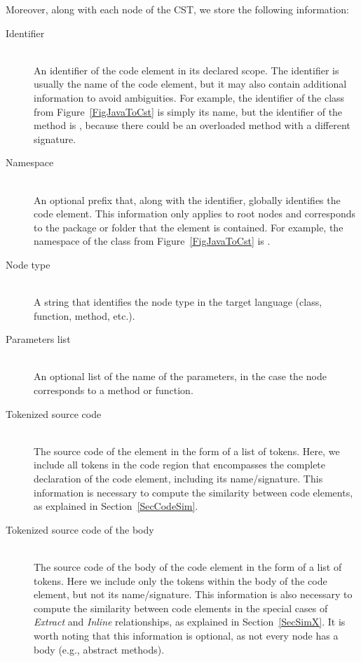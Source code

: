 Moreover, along with each node of the CST, we store the following information:
\begin{description}
    \item[Identifier] \hfill \\
    An identifier of the code element in its declared scope. 
    The identifier is usually the name of the code element, but it may also contain additional information to avoid ambiguities.
    For example, the identifier of the class  from Figure~\ref{FigJavaToCst} is simply its name, but the identifier of the method  is ,  because there could be an overloaded method with a different signature.
    
    \item[Namespace] \hfill \\
    An optional prefix that, along with the identifier, globally identifies the code element. 
    This information only applies to root nodes and corresponds to the package or folder that the element is contained. For example, the namespace of the class  from Figure~\ref{FigJavaToCst} is .
    
    \item[Node type] \hfill \\
    A string that identifies the node type in the target language (class, function, method, etc.).
    
    \item[Parameters list]  \hfill \\
    An optional list of the name of the parameters, in the case the node corresponds to a method or function.
    
    \item[Tokenized source code]  \hfill \\
    The source code of the element in the form of a list of tokens.
    Here, we include all tokens in the code region that encompasses the complete declaration of the code element, including its name/signature.
    This information is necessary to compute the similarity between code elements, as explained in Section~\ref{SecCodeSim}.
    
    
    \item[Tokenized source code of the body]  \hfill \\
    The source code of the body of the code element in the form of a list of tokens.
    Here we include only the tokens within the body of the code element, but not its name/signature.
    This information is also necessary to compute the similarity between code elements in the special cases of \textit{Extract} and \textit{Inline} relationships, as explained in Section~\ref{SecSimX}.
    It is worth noting that this information is optional, as not every node has a body (e.g., abstract methods).
    
\end{description}

